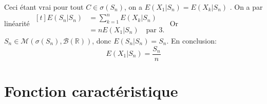 \documentclass{report}
\begin{document}
Ceci étant vrai pour tout $C\in \sigma(S_n)$, on a $E(X_1|S_n)=E(X_k|S_n)$\newline
{}. On a par linéarité $\begin{aligned}[t]
E(S_n|S_n)&=\sum_{k=1}^n E(X_k|S_n) \\
&= n E(X_1|S_n) \quad \text{par 3}.
\end{aligned}$ \newline
Or $S_n\in \mathcal M(\sigma(S_n),\mathcal B(\mathbb R))$, donc $E(S_n|S_n)= S_n$. En conclusion: $$E(X_1|S_n)=\frac{S_n}{n}$$

\newpage
\section{Fonction caractéristique}
\end{document}

